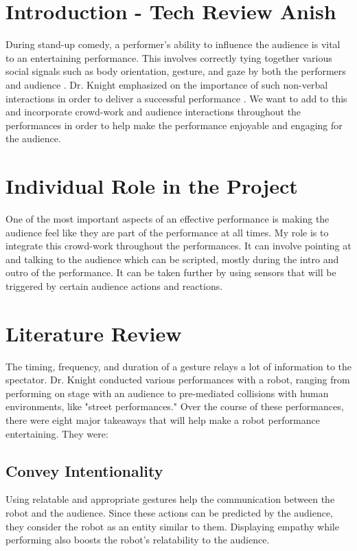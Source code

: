 

\section{Introduction - Tech Review Anish}
During stand-up comedy, a performer's ability to influence the audience is vital to an entertaining performance. This involves correctly tying together various social signals such as body orientation, gesture, and gaze by both the performers and audience \cite{RobotComedyLab:2015}. Dr. Knight emphasized on the importance of such non-verbal interactions in order to deliver a successful performance \cite{KnightEightLessons:2011}. We want to add to this and incorporate crowd-work and audience interactions throughout the performances in order to help make the performance enjoyable and engaging for the audience.

\section{Individual Role in the Project}
One of the most important aspects of an effective performance is making the audience feel like they are part of the performance at all times. My role is to integrate this crowd-work throughout the performances. It can involve pointing at and talking to the audience which can be scripted, mostly during the intro and outro of the performance. It can be taken further by using sensors that will be triggered by certain audience actions and reactions.

\section{Literature Review}
The timing, frequency, and duration of a gesture relays a lot of information to the spectator. Dr. Knight conducted various performances with a robot, ranging from performing on stage with an audience to pre-mediated collisions with human environments, like "street performances." Over the course of these performances, there were eight major takeaways that will help make a robot performance entertaining. They were:

\subsection{Convey Intentionality}
Using relatable and appropriate gestures help the communication between the robot and the audience. Since these actions can be predicted by the audience, they consider the robot as an entity similar to them. Displaying empathy while performing also boosts the robot's relatability to the audience.


